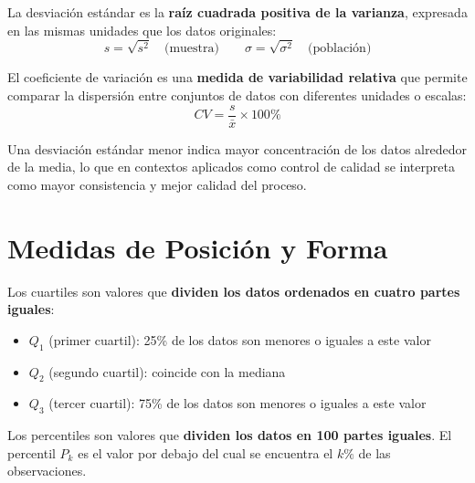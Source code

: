 \begin{definition}
La desviación estándar es la \textbf{raíz cuadrada positiva de la varianza}, expresada en las mismas unidades que los datos originales:
\begin{equation}
s = \sqrt{s^2} \quad \text{(muestra)} \qquad \sigma = \sqrt{\sigma^2} \quad \text{(población)}
\end{equation}
\end{definition}

\begin{definition}
El coeficiente de variación es una \textbf{medida de variabilidad relativa} que permite comparar la dispersión entre conjuntos de datos con diferentes unidades o escalas:
\begin{equation}
CV = \frac{s}{\bar{x}} \times 100\%
\end{equation}
\end{definition}

\begin{remark}
Una desviación estándar menor indica mayor concentración de los datos alrededor de la media, lo que en contextos aplicados como control de calidad se interpreta como mayor consistencia y mejor calidad del proceso.
\end{remark}

\section{Medidas de Posición y Forma}

\begin{definition}[Cuartiles]
Los cuartiles son valores que \textbf{dividen los datos ordenados en cuatro partes iguales}:
\begin{itemize}
    \item $Q_1$ (primer cuartil): 25\% de los datos son menores o iguales a este valor
    \item $Q_2$ (segundo cuartil): coincide con la mediana
    \item $Q_3$ (tercer cuartil): 75\% de los datos son menores o iguales a este valor
\end{itemize}
\end{definition}

\begin{definition}[Percentiles]
Los percentiles son valores que \textbf{dividen los datos en 100 partes iguales}. El percentil $P_k$ es el valor por debajo del cual se encuentra el $k\%$ de las observaciones.
\end{definition}

